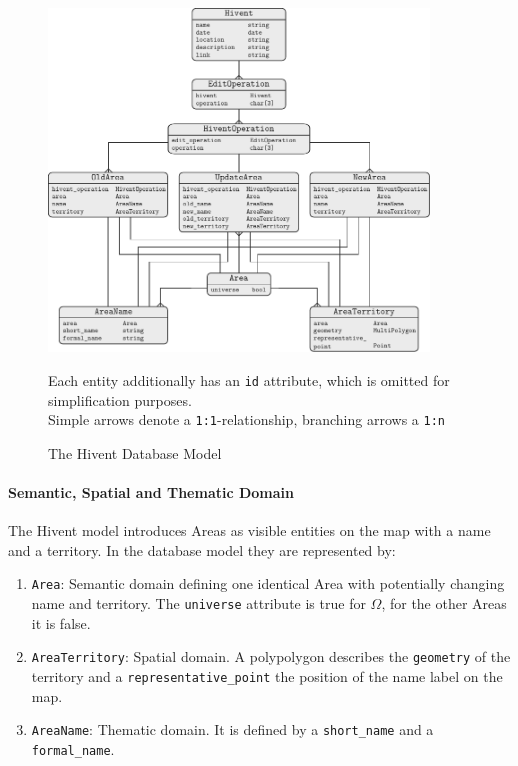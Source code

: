 \begin{figure}[ht]
  \centering
  \includegraphics[width=0.9\textwidth]{graphics/development/implementation/database_model}
  \caption{The Hivent Database Model}
  \small{Each entity additionally has an \texttt{id} attribute, which is omitted for simplification purposes.} \\
  \small{Simple arrows denote a \texttt{1:1}-relationship, branching arrows a \texttt{1:n}}
  \label{fig:database_model_er}
\end{figure}

\paragraph{Semantic, Spatial and Thematic Domain} %
\label{par:semantic_spatial_and_thematic_domain}

The Hivent model introduces Areas as visible entities on the map with a name and a territory. In the database model they are represented by:

\begin{enumerate}
  \item \texttt{Area}: Semantic domain defining one identical Area with potentially changing name and territory. The \texttt{universe} attribute is true for $\Omega$, for the other Areas it is false.
  \item \texttt{AreaTerritory}: Spatial domain. A polypolygon describes the \texttt{geometry} of the territory and a \texttt{representative\_point} the position of the name label on the map.
  \item \texttt{AreaName}: Thematic domain. It is defined by a \texttt{short\_name} and a \texttt{formal\_name}.
\end{enumerate}

